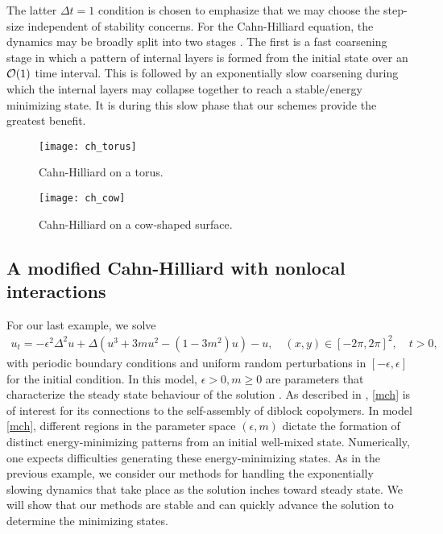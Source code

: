 The latter $\Delta t =1$ condition is chosen to emphasize that we may choose the step-size independent of stability concerns. For the Cahn-Hilliard equation, the dynamics may be broadly split into two stages \cite{sun2000dynamics}. The first is a fast coarsening stage in which a pattern of internal layers is formed from the initial state over an $\mathcal{O}(1)$ time interval. This is followed by an exponentially slow coarsening during which the internal layers may collapse together to reach a stable/energy minimizing state. It is during this slow phase that our schemes provide the greatest benefit. 

\begin{figure}[htb!]
	\centering
\texttt{[image: ch\_torus]}
\caption[Cahn-Hilliard on a torus]{Cahn-Hilliard on a torus.}
\label{fig:ch torus}
\end{figure}
\begin{figure}[htb!]
	\centering
\texttt{[image: ch\_cow]}
\caption[Cahn-Hilliard on a cow-shaped surface]{Cahn-Hilliard on a cow-shaped surface.}
\label{fig:ch cow}
\end{figure}

\subsection{A modified Cahn-Hilliard with nonlocal interactions}
For our last example, we solve 
\begin{align}
        u_t = -\epsilon^2 \Delta^2 u + \Delta (u^3 + 3mu^2 - (1-3m^2)u) - u, 
\quad (x,y)\in[-2\pi,2\pi]^2,
\quad t>0,
\label{mch}
\end{align}
with periodic boundary conditions and uniform random perturbations in $[-\epsilon,\epsilon]$ for the initial condition. In this model, $\epsilon>0, m\geq 0$ are parameters that characterize the steady state behaviour of the solution \cite{choksi2009phase,choksi20112d}. As described in \cite{choksi2009phase}, \cref{mch} is of interest for its connections to the self-assembly of diblock copolymers. In model \cref{mch}, different regions in the parameter space $(\epsilon, m)$ dictate the formation of distinct energy-minimizing patterns from an initial well-mixed state. Numerically, one expects difficulties generating these energy-minimizing states. As in the previous example, we consider our methods for handling the exponentially slowing dynamics that take place as the solution inches toward steady state. We will show that our methods are stable and can quickly advance the solution to determine the minimizing states. 

